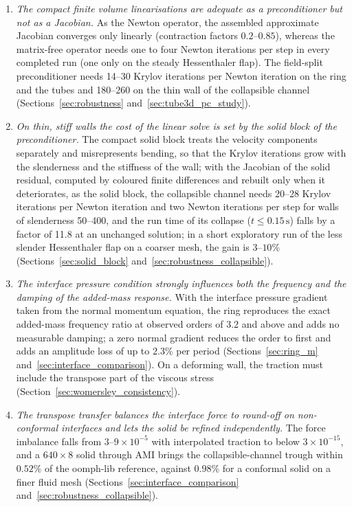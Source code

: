 \begin{enumerate}
	\item \emph{The compact finite volume linearisations are adequate as a preconditioner but not as a Jacobian.} As the Newton operator, the assembled approximate Jacobian converges only linearly (contraction factors $0.2$--$0.85$), whereas the matrix-free operator needs one to four Newton iterations per step in every completed run (one only on the steady Hessenthaler flap). The field-split preconditioner needs 14--30 Krylov iterations per Newton iteration on the ring and the tubes and 180--260 on the thin wall of the collapsible channel (Sections~\ref{sec:robustness} and~\ref{sec:tube3d_pc_study}).
	\item \emph{On thin, stiff walls the cost of the linear solve is set by the solid block of the preconditioner.} The compact solid block treats the velocity components separately and misrepresents bending, so that the Krylov iterations grow with the slenderness and the stiffness of the wall; with the Jacobian of the solid residual, computed by coloured finite differences and rebuilt only when it deteriorates, as the solid block, the collapsible channel needs 20--28 Krylov iterations per Newton iteration and two Newton iterations per step for walls of slenderness 50--400, and the run time of its collapse ($t \le 0.15\,\mathrm{s}$) falls by a factor of 11.8 at an unchanged solution; in a short exploratory run of the less slender Hessenthaler flap on a coarser mesh, the gain is $3$--$10\%$ (Sections~\ref{sec:solid_block} and~\ref{sec:robustness_collapsible}).
	\item \emph{The interface pressure condition strongly influences both the frequency and the damping of the added-mass response.} With the interface pressure gradient taken from the normal momentum equation, the ring reproduces the exact added-mass frequency ratio at observed orders of 3.2 and above and adds no measurable damping; a zero normal gradient reduces the order to first and adds an amplitude loss of up to $2.3\%$ per period (Sections~\ref{sec:ring_m} and~\ref{sec:interface_comparison}). On a deforming wall, the traction must include the transpose part of the viscous stress (Section~\ref{sec:womersley_consistency}).
	\item \emph{The transpose transfer balances the interface force to round-off on non-conformal interfaces and lets the solid be refined independently.} The force imbalance falls from $3$--$9\times10^{-5}$ with interpolated traction to below $3\times10^{-15}$, and a $640\times8$ solid through AMI brings the collapsible-channel trough within $0.52\%$ of the oomph-lib reference, against $0.98\%$ for a conformal solid on a finer fluid mesh (Sections~\ref{sec:interface_comparison} and~\ref{sec:robustness_collapsible}).

\end{enumerate}
